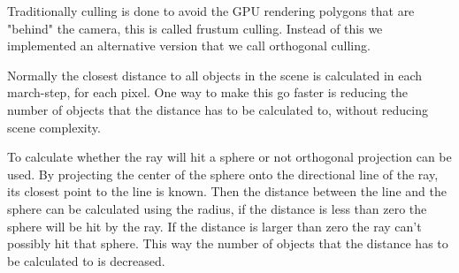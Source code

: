 			Traditionally culling is done to avoid the GPU rendering polygons 
			that are "behind" the camera, this is called frustum culling. Instead 
			of this we implemented an alternative version that we call orthogonal
			culling.

			Normally the closest distance to all objects in the scene is calculated
			in each march-step, for each pixel. One way to make this go faster is 
			reducing the number of objects that the distance has to be calculated 
			to, without reducing scene complexity. 

			To calculate whether the ray will hit a sphere or not orthogonal 
			projection can be used. By projecting the center of the sphere onto
			the directional line of the ray, its closest point to the line is known.
			Then the distance between the line and the sphere can be calculated using
			the radius, if the distance is less than zero the sphere will be hit
			by the ray. If the distance is larger than zero the ray can't possibly hit 
			that sphere. This way the number of objects that the distance has to be 
			calculated to is decreased. 



		
			
